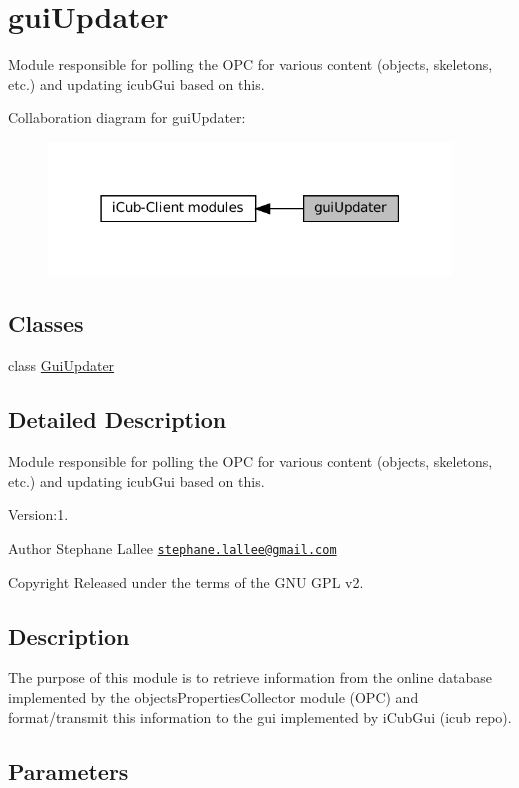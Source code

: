 \hypertarget{group__guiUpdater}{}\section{gui\+Updater}
\label{group__guiUpdater}


Module responsible for polling the O\+PC for various content (objects, skeletons, etc.) and updating icub\+Gui based on this.  


Collaboration diagram for gui\+Updater\+:
\nopagebreak
\begin{figure}[H]
\begin{center}
\leavevmode
\includegraphics[width=303pt]{group__guiUpdater}
\end{center}
\end{figure}
\subsection*{Classes}
\begin{DoxyCompactItemize}
\item 
class \hyperlink{group__guiUpdater_classGuiUpdater}{Gui\+Updater}
\end{DoxyCompactItemize}


\subsection{Detailed Description}
Module responsible for polling the O\+PC for various content (objects, skeletons, etc.) and updating icub\+Gui based on this. 

Version\+:1. \begin{DoxyAuthor}{Author}
Stephane Lallee \href{mailto:stephane.lallee@gmail.com}{\tt stephane.\+lallee@gmail.\+com} ~\newline
 
\end{DoxyAuthor}
\begin{DoxyCopyright}{Copyright}
Released under the terms of the G\+NU G\+PL v2. 
\end{DoxyCopyright}
\hypertarget{group__touchDetector_intro_sec}{}\subsection{Description}\label{group__touchDetector_intro_sec}
The purpose of this module is to retrieve information from the online database implemented by the objects\+Properties\+Collector module (O\+PC) and format/transmit this information to the gui implemented by i\+Cub\+Gui (icub repo).\hypertarget{group__touchDetector_parameters_sec}{}\subsection{Parameters}\label{group__touchDetector_parameters_sec}

